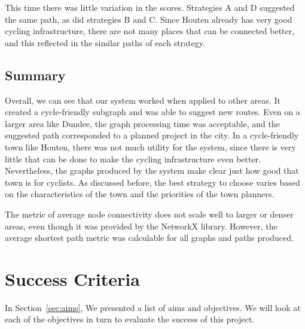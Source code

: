 \documentclass[12pt,a4paper]{report}
\begin{document}
This time there was little variation in the scores. Strategies A and D suggested the same path, as did strategies B and C. Since Houten already has very good cycling infrastructure, there are not many places that can be connected better, and this reflected in the similar paths of each strategy.

\subsection{Summary}
Overall, we can see that our system worked when applied to other areas. It created a cycle-friendly subgraph and was able to suggest new routes. Even on a larger area like Dundee, the graph processing time was acceptable, and the suggested path corresponded to a planned project in the city. In a cycle-friendly town like Houten, there was not much utility for the system, since there is very little that can be done to make the cycling infrastructure even better. Nevertheless, the graphs produced by the system make clear just how good that town is for cyclists. As discussed before, the best strategy to choose varies based on the characteristics of the town and the priorities of the town planners.

The metric of average node connectivity does not scale well to larger or denser areas, even though it was provided by the NetworkX library. However, the average shortest path metric was calculable for all graphs and paths produced.

\section{Success Criteria}\label{sec:success}
In Section~\ref{sec:aims}, We presented a list of aims and objectives. We will look at each of the objectives in turn to evaluate the success of this project.
\end{document}
